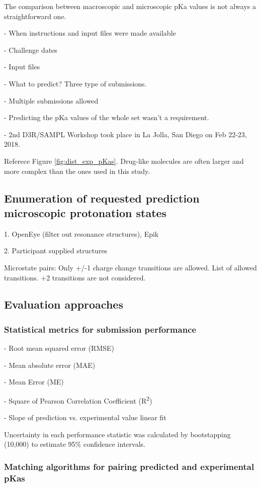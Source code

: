 \documentclass[9pt,lineno,final]{elife}
\begin{document}
The comparison between macroscopic and microscopic pKa values is not always a straightforward one. 

- When instructions and input files were made available

- Challenge dates

- Input files

- What to predict? Three type of submissions.

- Multiple submissions allowed

- Predicting the pKa values of the whole set wasn't a requirement. 

- 2nd D3R/SAMPL Workshop took place in La Jolla, San Diego on Feb 22-23, 2018.

Referece Figure \ref{fig:dist_exp_pKas}. Drug-like molecules are often larger and more complex than the ones used in this study.


\subsection{Enumeration of requested prediction microscopic protonation states}
1. OpenEye (filter out resonance structures), Epik  

2. Participant supplied structures  

Microstate pairs: Only +/-1 charge change transitions are allowed.
List of allowed transitions. +2 transitions are not considered.


\subsection{Evaluation approaches}

\subsubsection{Statistical metrics for submission performance}

- Root mean squared error (RMSE)

- Mean absolute error (MAE)

- Mean Error (ME)

- Square of Pearson Correlation Coefficient (R\textsuperscript{2})

- Slope of prediction vs. experimental value linear fit

Uncertainty in each performance statistic was calculated by bootstapping (10,000) to estimate 95\% confidence intervals.

\subsubsection{Matching algorithms for pairing predicted and experimental pKas}
\end{document}
